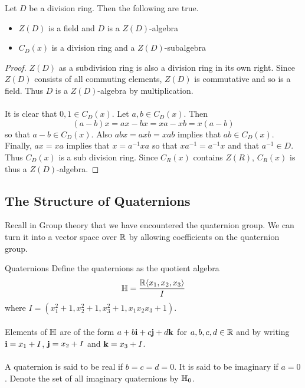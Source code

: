 \documentclass[a4paper]{article}
\begin{document}
\begin{lmm}{}{} Let $D$ be a division ring. Then the following are true. 
\begin{itemize}
\item $Z(D)$ is a field and $D$ is a $Z(D)$-algebra
\item $C_D(x)$ is a division ring and a $Z(D)$-subalgebra
\end{itemize} \tcbline
\begin{proof}
$Z(D)$ as a subdivision ring is also a division ring in its own right. Since $Z(D)$ consists of all commuting elements, $Z(D)$ is commutative and so is a field. Thus $D$ is a $Z(D)$-algebra by multiplication. \\~\\

It is clear that $0,1\in C_D(x)$. Let $a,b\in C_D(x)$. Then $$(a-b)x=ax-bx=xa-xb=x(a-b)$$ so that $a-b\in C_D(x)$. Also $abx=axb=xab$ implies that $ab\in C_D(x)$. Finally, $ax=xa$ implies that $x=a^{-1}xa$ so that $xa^{-1}=a^{-1}x$ and that $a^{-1}\in D$. Thus $C_D(x)$ is a sub division ring. Since $C_R(x)$ contains $Z(R)$, $C_R(x)$ is thus a $Z(D)$-algebra. 
\end{proof}
\end{lmm}

\subsection{The Structure of Quaternions}
Recall in Group theory that we have encountered the quaternion group. We can turn it into a vector space over $\mathbb{R}$ by allowing coefficients on the quaternion group. 

\begin{defn}{Quaternions}{} Define the quaternions as the quotient algebra $$\mathbb{H}=\frac{\mathbb{R}\langle x_1,x_2,x_3\rangle}{I}$$ where $I=(x_1^2+1,x_2^2+1,x_3^2+1,x_1x_2x_3+1)$. \\~\\
Elements of $\mathbb{H}$ are of the form $a+b\vb{i}+c\vb{j}+d\vb{k}$ for $a,b,c,d\in\mathbb{R}$ and by writing $\vb{i}=x_1+I$, $\vb{j}=x_2+I$ and $\vb{k}=x_3+I$. \\~\\
A quaternion is said to be real if $b=c=d=0$. It is said to be imaginary if $a=0$. Denote the set of all imaginary quaternions by $\mathbb{H}_0$. 
\end{defn}
\end{document}
